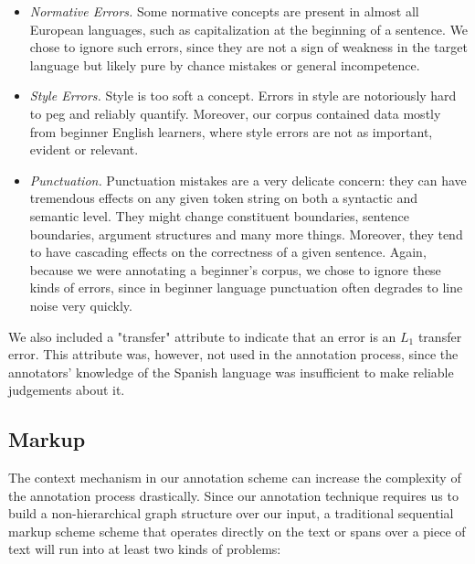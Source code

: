 \documentclass{article}
\begin{document}
\begin{itemize}
  \item \textit{Normative Errors.} Some normative concepts are present in almost
  all European languages, such as capitalization at the beginning of a sentence.
  We chose to ignore such errors, since they are not a sign of weakness in the
  target language but likely pure by chance mistakes or general incompetence.
  \item \textit{Style Errors.} Style is too soft a concept. Errors in style are
  notoriously hard to peg and reliably quantify. Moreover, our corpus
  contained data mostly from beginner English learners, where style errors are
  not as important, evident or relevant.
  \item \textit{Punctuation.} Punctuation mistakes are a very delicate concern:
  they can have tremendous effects on any given token string on both a syntactic
  and semantic level. They might change constituent boundaries, sentence
  boundaries, argument structures and many more things. Moreover, they tend to
  have cascading effects on the correctness of a given sentence. Again, because
  we were annotating a beginner's corpus, we chose to ignore these kinds of
  errors, since in beginner language punctuation often degrades to line noise
  very quickly.
\end{itemize}

We also included a "transfer" attribute to indicate that an error is an $L_1$
transfer error. This attribute was, however, not used in the annotation process,
since the annotators' knowledge of the Spanish language was insufficient to
make reliable judgements about it.

\subsection{Markup}

The context mechanism in our annotation scheme can increase the complexity of the annotation
process drastically. Since our annotation technique requires us to build a
non-hierarchical graph structure over our input\footnotemark, a traditional
sequential markup scheme scheme that operates directly on the text or spans
over a piece of text will run into at least two kinds of problems:

\end{document}
